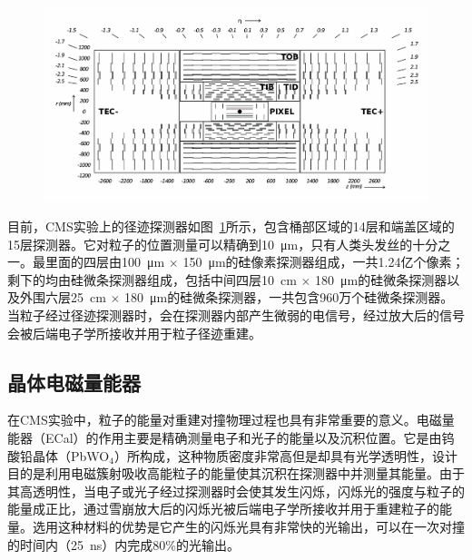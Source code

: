 \begin{figure}[!htbp]
    \centering
    \includegraphics[width=1.0\textwidth]{Thesis (Version 2246)/figures/chapter02/Schematic-cross-section-of-the-CMS-tracker-Each-line-represents-a-detector-module.png}
    \label{fig:c02f04}
\end{figure}

目前，CMS实验上的径迹探测器如图~\ref{fig:c02f04}所示，包含桶部区域的14层和端盖区域的15层探测器。它对粒子的位置测量可以精确到10~\si{\micro\meter}，只有人类头发丝的十分之一。最里面的四层由100~\si{\um} $\times$ 150~\si{\micro\meter}的硅像素探测器组成，一共1.24亿个像素；剩下的均由硅微条探测器组成，包括中间四层10~\si{\centi\meter} $\times$ 180~\si{\micro\meter}的硅微条探测器以及外围六层25~\si{\centi\meter} $\times$ 180~\si{\micro\meter}的硅微条探测器，一共包含960万个硅微条探测器。当粒子经过径迹探测器时，会在探测器内部产生微弱的电信号，经过放大后的信号会被后端电子学所接收并用于粒子径迹重建。



\subsection{晶体电磁量能器}

在CMS实验中，粒子的能量对重建对撞物理过程也具有非常重要的意义。电磁量能器（ECal）的作用主要是精确测量电子和光子的能量以及沉积位置。它是由钨酸铅晶体（PbWO$_{4}$）所构成，这种物质密度非常高但是却具有光学透明性，设计目的是利用电磁簇射吸收高能粒子的能量使其沉积在探测器中并测量其能量。由于其高透明性，当电子或光子经过探测器时会使其发生闪烁，闪烁光的强度与粒子的能量成正比，通过雪崩放大后的闪烁光被后端电子学所接收并用于重建粒子的能量。选用这种材料的优势是它产生的闪烁光具有非常快的光输出，可以在一次对撞的时间内（25~\si{ns}）内完成80\%的光输出。

